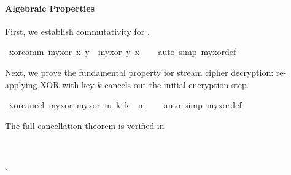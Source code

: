 \begin{isabellebody}
\begin{isamarkuptext}
\paragraph{Algebraic Properties}
  First, we establish commutativity for .%
\end{isamarkuptext}\isamarkuptrue%
\isamarkupfalse%
\ xor{\isacharunderscore}{\kern0pt}comm{\isacharcolon}{\kern0pt}\ {\isachardoublequoteopen}my{\isacharunderscore}{\kern0pt}xor\ x\ y\ {\isacharequal}{\kern0pt}\ my{\isacharunderscore}{\kern0pt}xor\ y\ x{\isachardoublequoteclose}\isanewline
%
\isadelimproof
\ \ %
\endisadelimproof
%
\isatagproof
{}\isamarkupfalse%
\ {\isacharparenleft}{\kern0pt}auto\ simp{\isacharcolon}{\kern0pt}\ my{\isacharunderscore}{\kern0pt}xor{\isacharunderscore}{\kern0pt}def{\isacharparenright}{\kern0pt}%
\endisatagproof
{\isafoldproof}%
%
\isadelimproof
%
\endisadelimproof
%
\begin{isamarkuptext}%
Next, we prove the fundamental property for stream cipher decryption:
  re-applying XOR with key $k$ cancels out the initial encryption step.%
\end{isamarkuptext}\isamarkuptrue%
\isamarkupfalse%
\ xor{\isacharunderscore}{\kern0pt}cancel{\isacharcolon}{\kern0pt}\ {\isachardoublequoteopen}my{\isacharunderscore}{\kern0pt}xor\ {\isacharparenleft}{\kern0pt}my{\isacharunderscore}{\kern0pt}xor\ m\ k{\isacharparenright}{\kern0pt}\ k\ {\isacharequal}{\kern0pt}\ m{\isachardoublequoteclose}\isanewline
%
\isadelimproof
\ \ %
\endisadelimproof
%
\isatagproof
{}\isamarkupfalse%
\ {\isacharparenleft}{\kern0pt}auto\ simp{\isacharcolon}{\kern0pt}\ my{\isacharunderscore}{\kern0pt}xor{\isacharunderscore}{\kern0pt}def{\isacharparenright}{\kern0pt}%
\endisatagproof
{\isafoldproof}%
%
\isadelimproof
%
\endisadelimproof
%
\begin{isamarkuptext}%
The full cancellation theorem is verified in %
\begin{isabelle}%
\ {\isacharparenleft}{\kern0pt}\ \ \ \ {\isacharequal}{\kern0pt}\ %
\end{isabelle}.%
\end{isamarkuptext}\isamarkuptrue%
%
\isadelimtheory
%
\endisadelimtheory
%
\isatagtheory
{}\isamarkupfalse%
%
\endisatagtheory
{\isafoldtheory}%
%
\isadelimtheory
%
\endisadelimtheory
%
\end{isabellebody}%
\endinput
